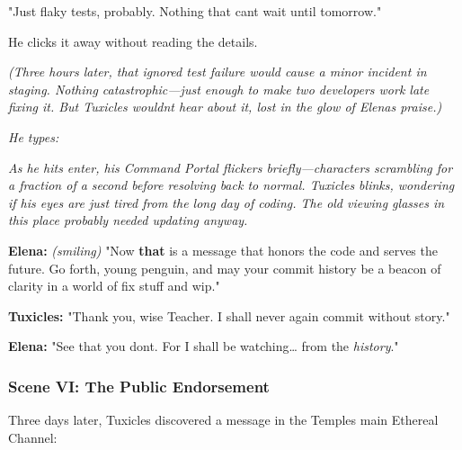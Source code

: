 "Just flaky tests, probably. Nothing that can\textquotesingle t wait until tomorrow."

He clicks it away without reading the details.

\emph{(Three hours later, that ignored test failure would cause a minor incident in staging. Nothing catastrophic---just enough to make two developers work late fixing it. But Tuxicles wouldn\textquotesingle t hear about it, lost in the glow of Elena\textquotesingle s praise.)}

\emph{He types:}


\emph{As he hits enter, his Command Portal flickers briefly---characters scrambling for a fraction of a second before resolving back to normal. Tuxicles blinks, wondering if his eyes are just tired from the long day of coding. The old viewing glasses in this place probably needed updating anyway.}

\textbf{Elena:} \emph{(smiling)} "Now \textbf{that} is a message that honors the code and serves the future. Go forth, young penguin, and may your commit history be a beacon of clarity in a world of \textquotesingle fix stuff\textquotesingle{} and \textquotesingle wip.\textquotesingle"

\textbf{Tuxicles:} "Thank you, wise Teacher. I shall never again commit without story."

\textbf{Elena:} "See that you don\textquotesingle t. For I shall be watching\ldots{} from the \emph{history}."

\bookdivider

\subsubsection{Scene VI: The Public Endorsement}\label{scene-vi-the-public-endorsement}

Three days later, Tuxicles discovered a message in the Temple\textquotesingle s main Ethereal Channel:

